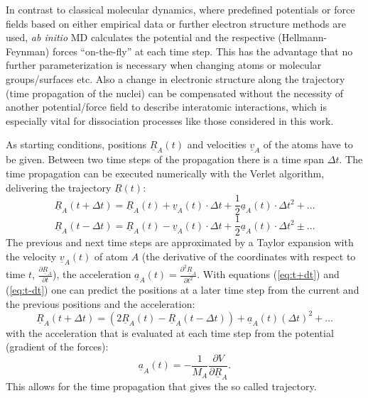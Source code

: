\documentclass[11pt,DIV=13,BCOR=5mm,a4paper,headinclude]{scrbook}
\renewcommand{\vec}[1]{\underline{#1}}
\begin{document}
In contrast to classical molecular dynamics, where predefined potentials or force fields based on either empirical data or further electron structure methods are used, \textit{ab initio} MD calculates the potential and the respective (Hellmann-Feynman) forces ``on-the-fly'' at each time step.
This has the advantage that no further parameterization is necessary when changing atoms or molecular groups/surfaces etc. Also a change in electronic structure along the trajectory (time propagation of the nuclei) can be compensated without the necessity of another potential/force field to describe interatomic interactions, which is especially vital for dissociation processes like those considered in this work.


As starting conditions, positions $\vec{R}_A(t)$ and velocities $\vec{v}_A$ of the atoms have to be given.
Between two time steps of the propagation there is a time span $\Delta t$.
The time propagation can be executed numerically with the Verlet algorithm\cite{verlet}, delivering the trajectory $\vec{R}(t)$:
\begin{equation}\label{eq:t+dt}
 \vec{R}_A(t+\Delta t) = \vec{R}_A(t) + \vec{v}_A(t)\cdot \Delta t + \frac{1}{2}\vec{a}_A(t)\cdot \Delta t^2 + ...
 \end{equation}
 \begin{equation}\label{eq:t-dt}
 \vec{R}_A(t-\Delta t) = \vec{R}_A(t) - \vec{v}_A(t)\cdot \Delta t + \frac{1}{2}\vec{a}_A(t)\cdot \Delta t^2 \pm ...
\end{equation}
The previous and next time steps are approximated by a Taylor expansion with the velocity $\vec{v}_A(t)$ of atom $A$ (the derivative of the coordinates with respect to time $t$, $\frac{\partial \vec{R}_A}{\partial t}$), the acceleration $\vec{a}_A(t)=\frac{\partial^2 \vec{R}_A}{\partial t^2}$.
With equations (\ref{eq:t+dt}) and (\ref{eq:t-dt}) one can predict the positions at a later time step from the current and the previous positions and the acceleration:
\begin{equation}
 \vec{R}_A(t+\Delta t)=(2\vec{R}_A(t) - \vec{R}_A(t-\Delta t)) + \vec{a}_A(t)(\Delta t)^2 + \ldots
\end{equation}
with the acceleration that is evaluated at each time step from the potential (gradient of the forces):
\begin{equation}
 \vec{a}_A(t)=-\frac{1}{M_A}\frac{\partial V}{\partial\vec{R}_A}.
\end{equation}
This allows for the time propagation that gives the so called trajectory.
\end{document}
